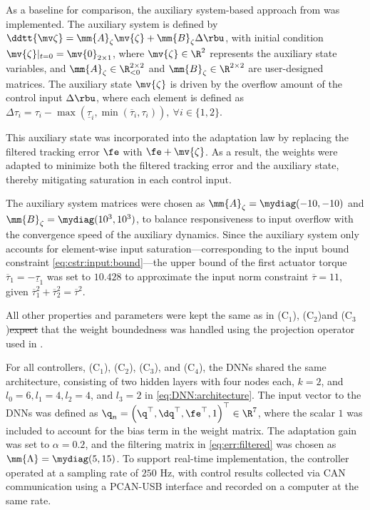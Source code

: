 \documentclass[letterpaper, journal]{IEEEtran}
\providecommand{\DIFadd}[1]{{\protect\color{blue}\uwave{#1}}} %
\providecommand{\DIFdel}[1]{{\protect\color{red}\sout{#1}}} %
\providecommand{\DIFaddbegin}{} %
\providecommand{\DIFaddend}{} %
\providecommand{\DIFdelbegin}{} %
\providecommand{\DIFdelend}{} %
\begin{document}
As a baseline for comparison, the auxiliary system-based approach from \cite{Esfandiari:2014aa, Karason:1994aa, Esfandiari:2015aa} was implemented.
The auxiliary system is defined by $\ddtt{\mv\zeta} = \mm{A}_\zeta \mv{\zeta} + \mm{B}_\zeta \Delta\rbu$, with initial condition $\mv{\zeta}\vert_{t=0} = \mv{0}_{2\times1}$, where $\mv{\zeta}\in\R^2$ represents the auxiliary state variables, and $\mm{A}_\zeta\in\R_{<0}^{2\times 2}$ and $\mm{B}_\zeta\in\R^{2\times 2}$ are user-designed matrices.
The auxiliary state $\mv{\zeta}$ is driven by the overflow amount of the control input $\Delta\rbu$, where each element is defined as $\Delta\tau_{i} = \tau_{i}-\max(\underline\tau_i,\min(\overline\tau_i,\tau_i)),\ \forall i\in\{1,2\}$.

This auxiliary state was incorporated into the adaptation law by replacing the filtered tracking error $\fe$ with $\fe+\mv{\zeta}$.
As a result, the weights were adapted to minimize both the filtered tracking error and the auxiliary state, thereby mitigating saturation in each control input.

The auxiliary system matrices were chosen as $\mm{A}_\zeta=\mydiag(-10,-10)$ and $\mm{B}_\zeta=\mydiag(10^3,10^3)$, 
to balance responsiveness to input overflow with the convergence speed of the auxiliary dynamics.
Since the auxiliary system only accounts for element-wise input saturation—corresponding to the input bound constraint \eqref{eq:cstr:input:bound}—the upper bound of the first actuator torque $\overline{\tau}_1=-\underline{\tau}_1$ was set to $10.428$ to approximate the input norm constraint $\overline{\tau} = 11$, given $\overline{\tau}_1^2 + \overline{\tau}_2^2 = \overline{\tau}^2$.

All other properties and parameters were kept the same as in (C$_1$), (C$_2$)\DIFaddbegin \DIFadd{, }\DIFaddend and (C$_3$)\DIFdelbegin \DIFdel{expect }\DIFdelend \DIFaddbegin \DIFadd{, except }\DIFaddend that the weight boundedness was handled using the projection operator used in \cite{Patil:2022aa}.

\hfill

For all controllers, \ie (C$_1$), (C$_2$), (C$_3$), and (C$_4$), the DNNs shared the same architecture, consisting of two hidden layers with four nodes each, \ie $k=2$, and $l_0=6, l_1=4, l_2=4$, and $l_3=2$ in \eqref{eq:DNN:architecture}.
The input vector to the DNNs was defined as ${\q}_n=\left(\q^\top,\dq^\top,\fe^\top,1\right)^\top\in\R^{7}$, where the scalar $1$ was included to account for the bias term in the weight matrix.
The adaptation gain was set to $\alpha = 0.2$, and the filtering matrix in \eqref{eq:err:filtered} was chosen as $\mm{\Lambda}=\mydiag(5,15)$.
To support real-time implementation, the controller operated at a sampling rate of $250$ Hz, with control results collected via CAN communication using a PCAN-USB interface and recorded on a computer at the same rate.
\end{document}
